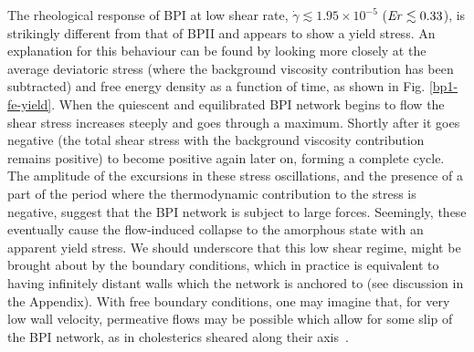 \documentclass[aps,pre,reprint,superscriptaddress, twocolumn]{revtex4}
\newcommand{\e}[1]{\times10^{#1}}
\newcommand{\gd}{\dot{\gamma}}
\begin{document}
The rheological response of BPI at low shear rate, $\gd\lesssim1.95\e{-5}$
(${\it Er} \lesssim 0.33$), 
is strikingly different from that of BPII and appears to show a
yield stress. An explanation for this behaviour can be found by 
looking more closely at the average deviatoric stress (where the
background viscosity contribution has been subtracted) and 
free energy density as a function of time, as shown in Fig. \ref{bp1-fe-yield}.
When the quiescent and equilibrated BPI network begins to flow
the shear stress increases steeply and goes through a maximum.
Shortly after it goes negative (the total shear stress 
with the background viscosity contribution remains positive) 
to become positive again later on, forming a complete cycle.
The amplitude of the excursions in these stress oscillations, and
the presence of a part of the period where the thermodynamic
contribution to the stress is negative, suggest that the
BPI network is subject to large forces. Seemingly, these eventually
cause the flow-induced collapse to the amorphous state with
an apparent yield stress. We should underscore that this
low shear regime, might be brought about by the boundary
conditions, which in practice is equivalent to having infinitely
distant walls which the network is anchored to (see discussion
in the Appendix).
With free boundary conditions,
one may imagine that, for very low wall velocity, 
permeative flows may be possible which allow for
some slip of the BPI network, as in cholesterics sheared
along their axis~\cite{Marenduzzo:2006b}.
\end{document}
